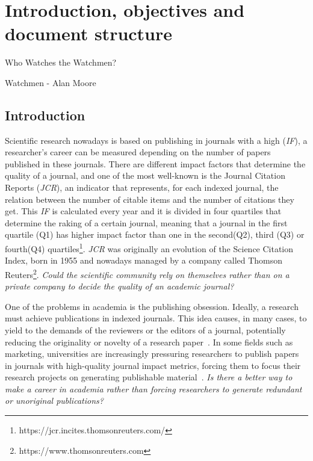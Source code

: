 
\chapter{Introduction, objectives and document structure}
\label{intro}
\begin{FraseCelebre}
  \begin{Frase}
    Who Watches the Watchmen?
  \end{Frase}
  \begin{Fuente}
    Watchmen - Alan Moore
  \end{Fuente}
\end{FraseCelebre}

\section{Introduction}

Scientific research nowadays is based on publishing in journals with a high
 (\emph{IF})\cite{doi:10.1001/jama.295.1.90}, a researcher's
career can be measured depending on the number of papers published in these
journals. There are different impact factors that determine the quality of a
journal, and one of the most well-known is the Journal Citation Reports
(\emph{JCR}), an indicator that represents, for each indexed journal, the
relation between the number of citable items and the number of citations they
get. This \emph{IF} is calculated every year and it is divided in four quartiles
that determine the raking of a certain journal, meaning that a journal in the
first quartile (Q1) has higher impact factor than one in the second(Q2), third
(Q3) or fourth(Q4) quartiles\footnote{https://jcr.incites.thomsonreuters.com/}.
\emph{JCR} was originally an evolution of the Science Citation Index, born in
1955 \cite{garfield2007evolution} and nowadays managed by a company called
Thomson Reuters\footnote{https://www.thomsonreuters.com}. \emph{ Could the
  scientific community rely on themselves rather than on a private company to
  decide the quality of an academic journal?}

One of the problems in academia is the publishing obsession. Ideally, a research
must achieve publications in indexed journals. This idea causes, in many cases,
to yield to the demands of the reviewers or the editors of a journal,
potentially reducing the originality or novelty of a research
paper~\cite{Frey2003}. In some fields such as marketing, universities are
increasingly pressuring researchers to publish papers in journals with
high-quality journal impact metrics, forcing them to focus their research
projects on generating publishable material~\cite{ortinau2011writing}. \emph{ Is
  there a better way to make a career in academia rather than forcing
  researchers to generate redundant or unoriginal publications?}

